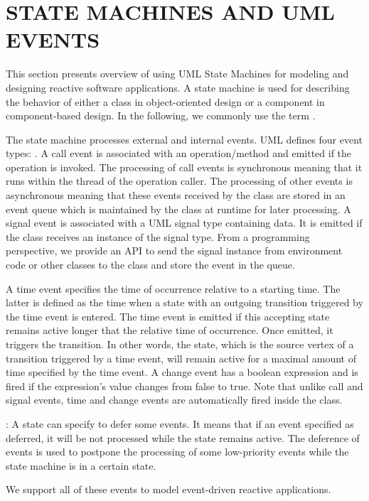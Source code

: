 \section{\uppercase{State Machines and UML events}}
\label{sec:modeling}
This section presents overview of using UML State Machines for modeling and designing reactive software applications. 
A state machine is used for describing the behavior of either a class in object-oriented design or a component in component-based design.
In the following, we commonly use the term .

The state machine processes external and internal events.
UML defines four event types: .
A call event is associated with an operation/method and emitted if the operation is invoked.
The processing of call events is synchronous meaning that it runs within the thread of the operation caller.
The processing of other events is asynchronous meaning that these events received by the class are stored in an event queue which is maintained by the class at runtime for later processing.
A signal event is associated with a UML signal type containing data.
It is emitted if the class receives an instance of the signal type.
From a programming perspective, we provide an API  to send the signal instance from environment code or other classes to the class and store the event in the queue.                                             
		
A time event specifies the time of occurrence relative to a starting time. 
The latter is defined as the time when a state with an outgoing transition triggered by the time event is entered.
The time event is emitted if this accepting state remains active longer that the relative time of occurrence. 
Once emitted, it triggers the transition.
In other words, the state, which is the source vertex of a transition triggered by a time event, will remain active for a maximal amount of time specified by the time event.	
A change event has a boolean expression and is fired if the expression's value changes from false to true. 
Note that unlike call and signal events, time and change events are automatically fired inside the class.

\vskip 0.1cm
\noindent
{}: A state can specify to defer some events.
It means that if an event specified as deferred, it will be not processed while the state remains active.
The deference of events is used to postpone the processing of some low-priority events while the state machine is in a certain state.


We support all of these events to model event-driven reactive applications.
                                        